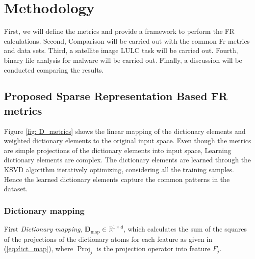 \documentclass[11pt]{article}
\DeclareMathOperator*{\Proj}{Proj}
\begin{document}
\section{Methodology}

First, we will define the metrics and provide a framework to perform the FR calculations. Second, Comparison will be carried out with the common Fr metrics and data sets. Third, a satellite image LULC task will be carried out. Fourth, binary file analysis for malware will be carried out. Finally, a discussion will be conducted comparing the results.

\subsection{Proposed Sparse Representation Based FR metrics}

Figure \ref{fig: D_metrics} shows the linear mapping of the dictionary elements and weighted dictionary elements to the original input space. Even though the metrics are simple projections of the dictionary elements into input space, Learning dictionary elements are complex. The dictionary elements are learned through the KSVD algorithm iteratively optimizing, considering all the training samples. Hence the learned dictionary elements capture the common patterns in the dataset. 


\begin{figure*}[!t]%
\centering
{}
\label{subfig: D_map}%
\qquad
{}
\label{subfig: D_util}
\caption{Projection of dictionary elements and weights into input space. (a) \textit{dictionary mapping} only projects the dictionary atoms. (b) \textit{dictionary utilization} projects the weighted dictionary atoms according to the sparse representation.}%
\label{fig: D_metrics}%
\end{figure*}


\subsubsection{Dictionary mapping}

First \textit{Dictionary mapping}, $\mathbf{D}_\textrm{map} \in \mathbb{R}^{1 \times d}$, which calculates the sum of the squares of the projections of the dictionary atoms for each feature as given in (\ref{eq:dict_map}), where $\Proj_j$ is the projection operator into feature $F_j$. 
\end{document}
